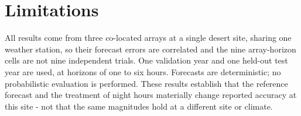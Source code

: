 \section{Limitations}
\label{sec:limitations}

All results come from three co-located arrays at a single desert site,
sharing one weather station, so their forecast errors are correlated
and the nine array-horizon cells are not nine independent trials. One
validation year and one held-out test year are used, at horizons of
one to six hours. Forecasts
are deterministic; no probabilistic evaluation is performed. These
results establish that the reference forecast and the treatment of
night hours materially change reported accuracy at this site - not
that the same magnitudes hold at a different site or climate.
